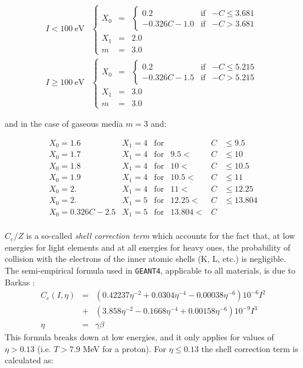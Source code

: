 \[
\begin{array}{ll}
I < 100 \: \mbox{eV} & \left \{
\begin{array}{lcl}
X_{0} & = & \left \{
\begin{array}{lll}
0.2 & \mbox{if} & -C \leq 3.681 \\
-0.326C-1.0 & \mbox{if} & -C > 3.681
\end{array} \right . \\
X_{1} & = & 2.0 \\
m & = & 3.0
\end{array} \right . \\ [1.0cm]
I \geq 100 \: \mbox{eV} & \left \{
\begin{array}{lcl}
X_{0} & = & \left \{
\begin{array}{lll}
0.2 & \mbox{if} & -C \leq 5.215 \\
-0.326C-1.5 & \mbox{if} & -C > 5.215
\end{array} \right . \\
X_{1} & = & 3.0 \\
m & = & 3.0
\end{array} \right .
\end{array}
\]

and in the case of gaseous media $m=3$ and:

\[
\begin{array}{llcrcl}
X_0 = 1.6 & X_1 = 4 & \mbox{for} &       & C & \leq 9.5 \\
X_0 = 1.7 & X_1 = 4 & \mbox{for} & 9.5 < & C & \leq 10 \\
X_0 = 1.8 & X_1 = 4 & \mbox{for} & 10  < & C & \leq 10.5 \\
X_0 = 1.9 & X_1 = 4 & \mbox{for} & 10.5 < & C & \leq 11 \\
X_0 = 2.  & X_1 = 4 & \mbox{for} & 11  < & C & \leq 12.25 \\
X_0 = 2.  & X_1 = 5 & \mbox{for} & 12.25 < & C & \leq 13.804 \\
X_0 = 0.326C-2.5 & X_1 = 5 & \mbox{for} & 13.804 < & C &  \\
\end{array}
\]

$C_e/Z$ is a so-called {\it shell correction term}
which accounts for the fact that, at
low energies for light elements and at all energies for heavy ones, the
probability of collision with the electrons of the inner atomic shells
(K, L, etc.) is negligible. The semi-empirical formula used in
{\tt GEANT4}, applicable to all materials, is due to Barkas \cite{hion.barkas}:
\begin{eqnarray*}
 C_e(I,\eta) & = & (0.42237\eta^{-2}+0.0304\eta^{-4}-0.00038\eta^{-6})
10^{-6} I^2 \\
& +& (3.858\eta^{-2}-0.1668\eta^{-4}+0.00158\eta^{-6})10^{-9}I^3 \\
\eta & = &  \gamma \beta
\end{eqnarray*}
This formula breaks down at low energies, and it only applies for values
of $\eta > 0.13$ (i.e. $T > 7.9$ MeV for a proton). For $\eta \leq
0.13$ the shell correction term is calculated as:

